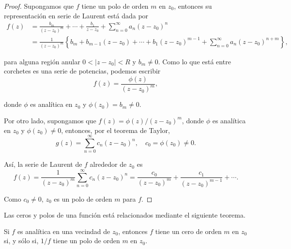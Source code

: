 \begin{proof}
 Supongamos que $f$ tiene un polo de orden $m$ en $z_0$, entonces su representación en serie de Laurent está dada por
\begin{align*}
 f(z) &= \frac{b_m}{(z-z_0)^m} + \cdots + \frac{b_1}{z-z_0} + \sum_{n=0}^{\infty} a_n (z-z_0)^n \\
 &= \frac{1}{(z-z_0)^m} \left\{ b_m + b_{m-1} (z-z_0) + \cdots + b_1 (z-z_0)^{m-1} + \sum_{n=0}^{\infty} a_n (z-z_0)^{n+m} \right\},
\end{align*}

para alguna región anular $0 < |z-z_0| < R$ y $b_m \neq 0$. Como lo que está entre corchetes es una serie de potencias, podemos escribir
\begin{equation*}
f(z) = \frac{\phi(z)}{(z-z_0)^m}, 
\end{equation*}

donde $\phi$ es analítica en $z_0$ y $\phi(z_0) = b_m \neq 0$. 

Por otro lado, supongamos que $f(z) = \phi(z)/(z-z_0)^m$, donde  $\phi$ es analítica en $z_0$ y $\phi(z_0) \neq 0$, entonces, por el teorema de Taylor,
$$g(z) = \sum_{n=0}^{\infty} c_n (z-z_0)^n, \quad c_0 = \phi(z_0) \neq 0.$$

Así, la serie de Laurent de $f$ alrededor de $z_0$ es
$$f(z) = \frac{1}{(z-z_0)^m} \sum_{n=0}^{\infty} c_n (z-z_0)^n = \frac{c_0}{(z-z_0)^m} + \frac{c_1}{(z-z_0)^{m-1}} + \cdots .$$

Como $c_0 \neq 0$, $z_0$ es un polo de orden $m$ para $f$.

\end{proof}

Las ceros y polos de una función está relacionados mediante el siguiente teorema.

\begin{teorema} \label{CeroYPolos}
Si $f$ es analítica en una vecindad de $z_0$, entonces $f$ tiene un cero de orden $m$ en $z_0$ si, y sólo si, $1/f$ tiene un polo de orden $m$ en $z_0$.
\end{teorema}

